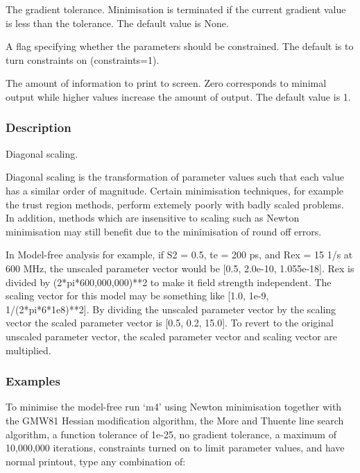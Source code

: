   The gradient tolerance.  Minimisation is terminated if the current gradient value is less than the tolerance.  The default value is None.

  A flag specifying whether the parameters should be constrained.  The default is to turn constraints on (constraints=1).


  The amount of information to print to screen.  Zero corresponds to minimal output while higher values increase the amount of output.  The default value is 1.

\subsubsection{Description}

Diagonal scaling.

Diagonal scaling is the transformation of parameter values such that each value has a
similar order of magnitude.  Certain minimisation techniques, for example the trust region
methods, perform extemely poorly with badly scaled problems.  In addition, methods which are
insensitive to scaling such as Newton minimisation may still benefit due to the minimisation
of round off errors.

In Model-free analysis for example, if S2 = 0.5, te = 200 ps, and Rex = 15 1/s at 600 MHz,
the unscaled parameter vector would be [0.5, 2.0e-10, 1.055e-18].  Rex is divided by
(2*pi*600,000,000)**2 to make it field strength independent.  The scaling vector for this
model may be something like [1.0, 1e-9, 1/(2*pi*6*1e8)**2].  By dividing the unscaled
parameter vector by the scaling vector the scaled parameter vector is [0.5, 0.2, 15.0].  To
revert to the original unscaled parameter vector, the scaled parameter vector and scaling
vector are multiplied.


\subsubsection{Examples}

To minimise the model-free run `m4' using Newton minimisation together with the GMW81
Hessian modification algorithm, the More and Thuente line search algorithm, a function
tolerance of 1e-25, no gradient tolerance, a maximum of 10,000,000 iterations, constraints
turned on to limit parameter values, and have normal printout, type any combination of:


